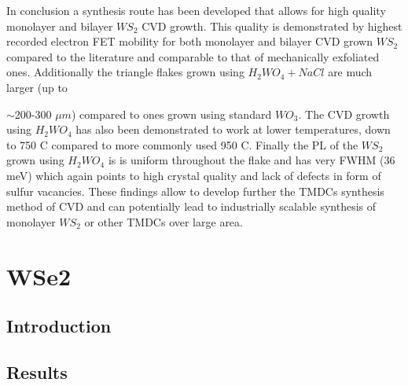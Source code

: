\documentclass[12pt]{article}
\begin{document}
In conclusion a synthesis route has been developed that allows for high quality monolayer and bilayer $WS_2$ CVD growth. This quality is demonstrated by highest recorded electron FET mobility for both monolayer and bilayer CVD grown $WS_2$ compared to the literature and comparable to that of mechanically exfoliated ones. Additionally the triangle flakes grown using $H_2WO_4 + NaCl$ are much larger (up to {$\sim$200-300 $\mu m$) compared to ones grown using standard $WO_3$. The CVD growth using $H_2WO_4$ has also been demonstrated to work at lower temperatures, down to 750 {\degree}C compared to more commonly used 950 {\degree}C. Finally the PL of the $WS_2$ grown using $H_2WO_4$ is is uniform throughout the flake and has very FWHM (36 meV) which again points to high crystal quality and lack of defects in form of sulfur vacancies. These findings allow to develop further the TMDCs synthesis method of CVD and can potentially lead to industrially scalable synthesis of monolayer $WS_2$ or other TMDCs over large area.


\section{WSe2}

	\subsection{Introduction}
	


	\subsection{Results}
	
}
\end{document}
